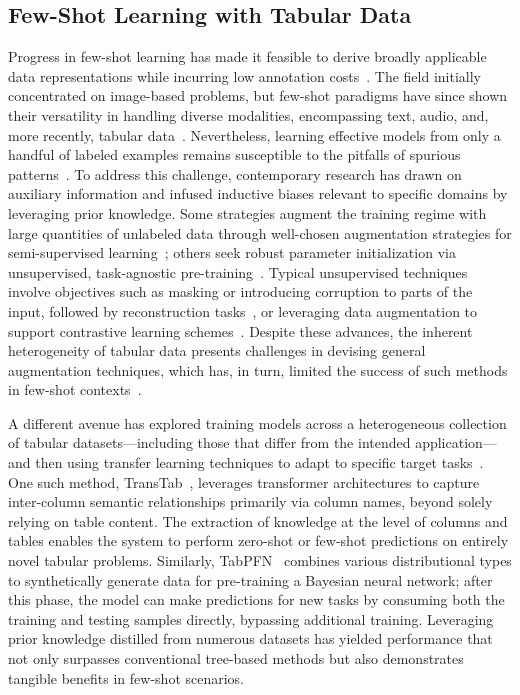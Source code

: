 \subsection{Few-Shot Learning with Tabular Data} Progress in few-shot learning has made it feasible to derive broadly applicable data representations while incurring low annotation costs~\cite{chen2018closer}. The field initially concentrated on image-based problems, but few-shot paradigms have since shown their versatility in handling diverse modalities, encompassing text, audio, and, more recently, tabular data~\cite{majumder2022few,nam2023stunt,schick2021exploiting}. Nevertheless, learning effective models from only a handful of labeled examples remains susceptible to the pitfalls of spurious patterns~\cite{bartlett2021deep}. To address this challenge, contemporary research has drawn on auxiliary information and infused inductive biases relevant to specific domains by leveraging prior knowledge. Some strategies augment the training regime with large quantities of unlabeled data through well-chosen augmentation strategies for semi-supervised learning~\cite{ucar2021subtab,yoon2020vime}; others seek robust parameter initialization via unsupervised, task-agnostic pre-training~\cite{somepalli2021saint}. Typical unsupervised techniques involve objectives such as masking or introducing corruption to parts of the input, followed by reconstruction tasks~\cite{arik2021tabnet,majmundar2022met}, or leveraging data augmentation to support contrastive learning schemes~\cite{bahri2022scarf,chen2020simple}. Despite these advances, the inherent heterogeneity of tabular data presents challenges in devising general augmentation techniques, which has, in turn, limited the success of such methods in few-shot contexts~\cite{nam2023stunt}.

A different avenue has explored training models across a heterogeneous collection of tabular datasets—including those that differ from the intended application—and then using transfer learning techniques to adapt to specific target tasks~\cite{zhang2023generative,levin2022transfer,zhu2023xtab}. One such method, TransTab~\cite{wang2022transtab}, leverages transformer architectures to capture inter-column semantic relationships primarily via column names, beyond solely relying on table content. The extraction of knowledge at the level of columns and tables enables the system to perform zero-shot or few-shot predictions on entirely novel tabular problems. Similarly, TabPFN~\cite{hollmann2022tabpfn} combines various distributional types to synthetically generate data for pre-training a Bayesian neural network; after this phase, the model can make predictions for new tasks by consuming both the training and testing samples directly, bypassing additional training. Leveraging prior knowledge distilled from numerous datasets has yielded performance that not only surpasses conventional tree-based methods but also demonstrates tangible benefits in few-shot scenarios.

